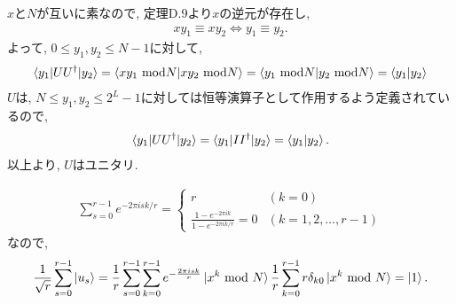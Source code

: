 \begin{ex}
    \label{ex5.12}
    $x$と$N$が互いに素なので, 定理D.9より$x$の逆元が存在し,
    \begin{align*}
        x y_1 \equiv x y_2 \Leftrightarrow y_1 \equiv y_2.
    \end{align*}
    よって, $0 \leq y_1, y_2 \leq N-1$に対して,
    \begin{align*}
        \braket{y_1 | U U^\dagger | y_2} = \braket{x y_1 \ \mathrm{mod} N| x y_2\ \mathrm{mod} N} = \braket{ y_1 \ \mathrm{mod} N|  y_2\ \mathrm{mod} N} =\braket{ y_1|  y_2}
    \end{align*}
    $U$は, $N \leq y_1, y_2 \leq 2^L - 1$に対しては恒等演算子として作用するよう定義されているので,
    \begin{align*}
        \braket{y_1 | U U^\dagger | y_2} =\braket{y_1 | I I^\dagger | y_2} = \braket{ y_1 |  y_2}.
    \end{align*}
    以上より, $U$はユニタリ.
\end{ex}

\begin{ex}
    \label{ex5.13}
    \begin{align*}
        \sum_{s=0}^{r-1} e^{-2 \pi i s k / r}
        =
        \begin{cases}
            r                                                      & (k=0)                   \\
            \frac{1 - e^{-2 \pi i k}}{ 1 - e^{-2 \pi i k / r}} = 0 & (k = 1, 2 ,\dots , r-1)
        \end{cases}
    \end{align*}
    なので,
    \begin{align*}
        \frac{1}{\sqrt{r}} \sum_{s=0}^{r-1} \ket{u_s}
        = \frac{1}{r} \sum_{s=0}^{r-1} \sum_{k=0}^{r-1} e^{-\frac{2 \pi i s k }{r}} \ket{x^k \ \mathrm{mod} \ N}
        \frac{1}{r} \sum_{k=0}^{r-1} r \delta_{k0} \ket{x^k \ \mathrm{mod} \ N}
        = \ket{1}.
    \end{align*}
\end{ex}

